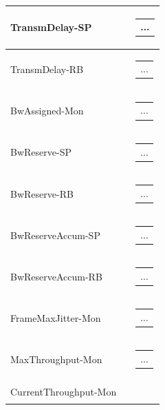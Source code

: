 \documentclass[openany]{article}
\begin{document}
\begin{longtable}{| m{3.0cm} m{4.5cm} m{7.0cm} |}
        TransmDelay-SP &  & \begin{tabular}{@{}m{6cm}@{}}
                ...
            \end{tabular} \\ \hline
        TransmDelay-RB &  & \begin{tabular}{@{}m{6cm}@{}}
                ...
            \end{tabular} \hypertarget{pv:bw-assigned}{}\\ \hline
        BwAssigned-Mon &  & \begin{tabular}{@{}m{6cm}@{}}
                ...
            \end{tabular} \hypertarget{pv:bw-reserve}{}\\ \hline
        BwReserve-SP &  & \begin{tabular}{@{}m{6cm}@{}}
                ...
            \end{tabular} \\ \hline
        BwReserve-RB &  & \begin{tabular}{@{}m{6cm}@{}}
                ...
            \end{tabular} \hypertarget{pv:bw-reserve-accum}{}\\ \hline
        BwReserveAccum-SP &  & \begin{tabular}{@{}m{6cm}@{}}
                ...
            \end{tabular} \\ \hline
        BwReserveAccum-RB &  & \begin{tabular}{@{}m{6cm}@{}}
                ...
            \end{tabular} \hypertarget{pv:frame-max-jitter}{}\\ \hline
        FrameMaxJitter-Mon &  & \begin{tabular}{@{}m{6cm}@{}}
                ...
            \end{tabular} \hypertarget{pv:max-throughput}{}\\ \hline
        MaxThroughput-Mon &  & \begin{tabular}{@{}m{6cm}@{}}
                ...
            \end{tabular} \hypertarget{pv:current-throughput}{}\\ \hline
        CurrentThroughput-Mon &  & \begin{tabular}{@{}m{6cm}@{}}

\end{tabular}
\end{longtable}
\end{document}
